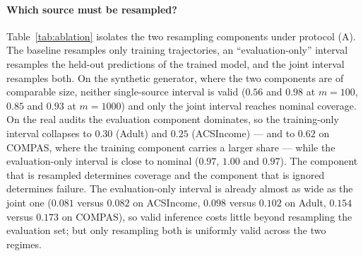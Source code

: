 \documentclass[10pt,twocolumn]{article}
\begin{document}
\paragraph{Which source must be resampled?}
Table~\ref{tab:ablation} isolates the two resampling components under protocol (A).  The
baseline resamples only training trajectories, an ``evaluation-only'' interval resamples the
held-out predictions of the trained model, and the joint interval resamples both.  On the
synthetic generator, where the two components are of comparable size, neither single-source
interval is valid ($0.56$ and $0.98$ at $m=100$, $0.85$ and $0.93$ at $m=1000$) and only the
joint interval reaches nominal coverage.  On the real audits the evaluation component dominates,
so the training-only interval collapses to $0.30$ (Adult) and $0.25$ (ACSIncome) --- and to
$0.62$ on COMPAS, where the training component carries a larger share --- while the
evaluation-only interval is close to nominal ($0.97$, $1.00$ and $0.97$).  The component that is
resampled determines coverage and the component that is ignored determines failure.  The
evaluation-only interval is already almost as wide as the joint one ($0.081$ versus $0.082$ on
ACSIncome, $0.098$ versus $0.102$ on Adult, $0.154$ versus $0.173$ on COMPAS), so valid inference
costs little beyond resampling the evaluation set; but only resampling both is uniformly valid
across the two regimes.

\begin{table}[t]
\centering
\small
\setlength{\tabcolsep}{3pt}
\caption{Source ablation under protocol (A), nominal coverage $0.95$: intervals that resample only
training trajectories, only the evaluation set, or both.  Synthetic DI: $T=2\times10^4$, $B=100$,
100 repetitions; real data: $T=3\times10^4$, $B=100$, 60 repetitions.}
\label{tab:ablation}
\end{table}
\end{document}
